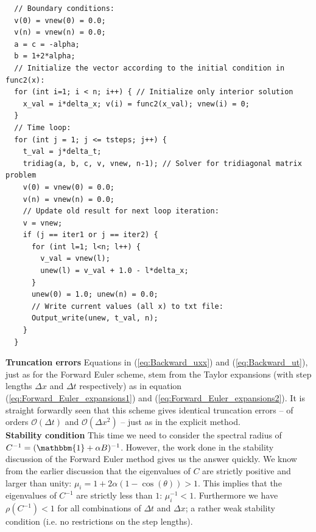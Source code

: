 \documentclass[a4paper, 11pt, notitlepage,english]{article}
\newcommand{\id}{\mathbbm{1}}
\begin{document}
\begin{center}
\begin{lstlisting}
  // Boundary conditions:
  v(0) = vnew(0) = 0.0;
  v(n) = vnew(n) = 0.0;
  a = c = -alpha; 
  b = 1+2*alpha; 
  // Initialize the vector according to the initial condition in func2(x):
  for (int i=1; i < n; i++) { // Initialize only interior solution
    x_val = i*delta_x; v(i) = func2(x_val); vnew(i) = 0;
  }
  // Time loop:
  for (int j = 1; j <= tsteps; j++) {
    t_val = j*delta_t;
    tridiag(a, b, c, v, vnew, n-1); // Solver for tridiagonal matrix problem
    v(0) = vnew(0) = 0.0;
    v(n) = vnew(n) = 0.0;
    // Update old result for next loop iteration:
    v = vnew;
    if (j == iter1 or j == iter2) {
      for (int l=1; l<n; l++) {
        v_val = vnew(l);
        unew(l) = v_val + 1.0 - l*delta_x;
      }
      unew(0) = 1.0; unew(n) = 0.0;
      // Write current values (all x) to txt file:
      Output_write(unew, t_val, n);
    }
  }
\end{lstlisting}
\end{center}

\textbf{Truncation errors} \newline
Equations in (\ref{eq:Backward_uxx}) and (\ref{eq:Backward_ut}), just as for the Forward Euler scheme, stem from the Taylor expansions (with step lengths $\Delta x$ and $\Delta t$ respectively) as in equation (\ref{eq:Forward_Euler_expansions1}) and (\ref{eq:Forward_Euler_expansions2}). It is straight forwardly seen that this scheme gives identical truncation errors – of orders $\mathcal{O}(\Delta t)$ and $\mathcal{O}(\Delta x^2)$ – just as in the explicit method. \\

\textbf{Stability condition} \newline
This time we need to consider the spectral radius of $C^{-1} = (\id + \alpha B)^{-1}$. However, the work done in the stability discussion of the Forward Euler method gives us the answer quickly. We know from the earlier discussion that the eigenvalues of $C$ are strictly positive and larger than unity: $\mu_i = 1 + 2\alpha(1-\cos(\theta)) > 1$. This implies that the eigenvalues of $C^{-1}$ are strictly less than $1$: $\mu_i^{-1} < 1$. Furthermore we have $\rho(C^{-1}) < 1$ for all combinations of $\Delta t$ and $\Delta x$; a rather weak stability condition (i.e. no restrictions on the step lengths).
\end{document}
